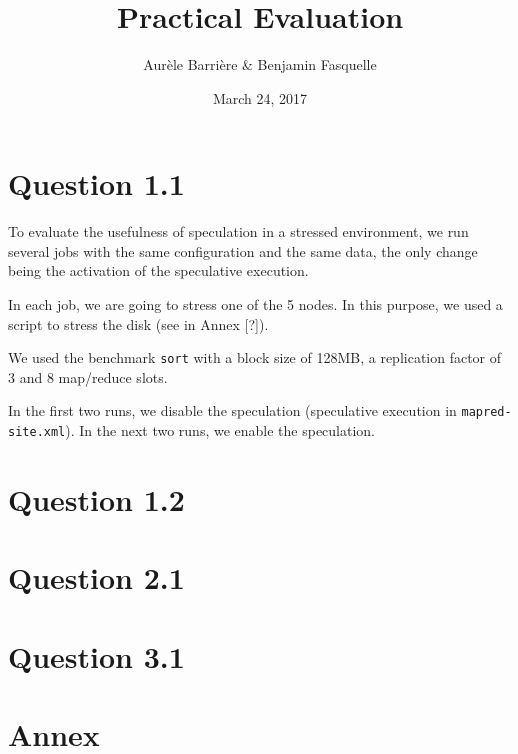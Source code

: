 \documentclass{article}
\author{Aur\`ele Barri\`ere \& Benjamin Fasquelle}
\title{Practical Evaluation}
\date{March 24, 2017}
\def\file#1{\texttt{#1}}
\def\bench#1{\texttt{#1}}
\begin{document}
\maketitle

\section*{Question 1.1}
To evaluate the usefulness of speculation in a stressed environment, we run several jobs with the same configuration and the same data, the only change being the activation of the speculative execution.

In each job, we are going to stress one of the 5 nodes. In this purpose, we used a script to stress the disk (see in Annex [?]).

We used the benchmark \bench{sort} with a block size of 128MB, a replication factor of 3 and 8 map/reduce slots.

In the first two runs, we disable the speculation (speculative execution in \file{mapred-site.xml}).
In the next two runs, we enable the speculation.



\section*{Question 1.2}

\section*{Question 2.1}

\section*{Question 3.1}

\section*{Annex}
\end{document}
